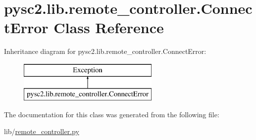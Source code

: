 \hypertarget{classpysc2_1_1lib_1_1remote__controller_1_1_connect_error}{}\section{pysc2.\+lib.\+remote\+\_\+controller.\+Connect\+Error Class Reference}
\label{classpysc2_1_1lib_1_1remote__controller_1_1_connect_error}
Inheritance diagram for pysc2.\+lib.\+remote\+\_\+controller.\+Connect\+Error\+:\begin{figure}[H]
\begin{center}
\leavevmode
\includegraphics[height=2.000000cm]{classpysc2_1_1lib_1_1remote__controller_1_1_connect_error}
\end{center}
\end{figure}


The documentation for this class was generated from the following file\+:\begin{DoxyCompactItemize}
\item 
lib/\mbox{\hyperlink{remote__controller_8py}{remote\+\_\+controller.\+py}}\end{DoxyCompactItemize}
